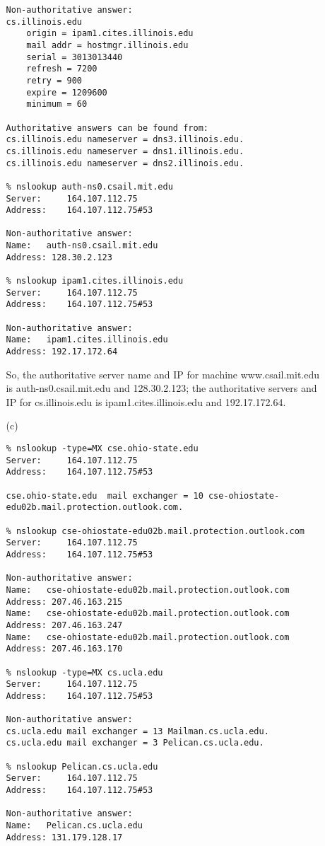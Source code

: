 \documentclass[12pt]{article}
\begin{document}
\begin{singlespace}
\begin{enumerate}
\begin{itemize}
\begin{lstlisting}
Non-authoritative answer:
cs.illinois.edu
	origin = ipam1.cites.illinois.edu
	mail addr = hostmgr.illinois.edu
	serial = 3013013440
	refresh = 7200
	retry = 900
	expire = 1209600
	minimum = 60

Authoritative answers can be found from:
cs.illinois.edu	nameserver = dns3.illinois.edu.
cs.illinois.edu	nameserver = dns1.illinois.edu.
cs.illinois.edu	nameserver = dns2.illinois.edu.

% nslookup auth-ns0.csail.mit.edu
Server:		164.107.112.75
Address:	164.107.112.75#53

Non-authoritative answer:
Name:	auth-ns0.csail.mit.edu
Address: 128.30.2.123

% nslookup ipam1.cites.illinois.edu
Server:		164.107.112.75
Address:	164.107.112.75#53

Non-authoritative answer:
Name:	ipam1.cites.illinois.edu
Address: 192.17.172.64
		\end{lstlisting}
	So, the authoritative server name and IP for machine www.csail.mit.edu is auth-ns0.csail.mit.edu and 128.30.2.123; the authoritative servers and IP for cs.illinois.edu is ipam1.cites.illinois.edu and 192.17.172.64.
	\item[(c)]
		\begin{lstlisting}
% nslookup -type=MX cse.ohio-state.edu
Server:		164.107.112.75
Address:	164.107.112.75#53

cse.ohio-state.edu	mail exchanger = 10 cse-ohiostate-edu02b.mail.protection.outlook.com.

% nslookup cse-ohiostate-edu02b.mail.protection.outlook.com
Server:		164.107.112.75
Address:	164.107.112.75#53

Non-authoritative answer:
Name:	cse-ohiostate-edu02b.mail.protection.outlook.com
Address: 207.46.163.215
Name:	cse-ohiostate-edu02b.mail.protection.outlook.com
Address: 207.46.163.247
Name:	cse-ohiostate-edu02b.mail.protection.outlook.com
Address: 207.46.163.170

% nslookup -type=MX cs.ucla.edu
Server:		164.107.112.75
Address:	164.107.112.75#53

Non-authoritative answer:
cs.ucla.edu	mail exchanger = 13 Mailman.cs.ucla.edu.
cs.ucla.edu	mail exchanger = 3 Pelican.cs.ucla.edu.

% nslookup Pelican.cs.ucla.edu
Server:		164.107.112.75
Address:	164.107.112.75#53

Non-authoritative answer:
Name:	Pelican.cs.ucla.edu
Address: 131.179.128.17


\end{lstlisting}
\end{itemize}
\end{enumerate}
\end{singlespace}
\end{document}
